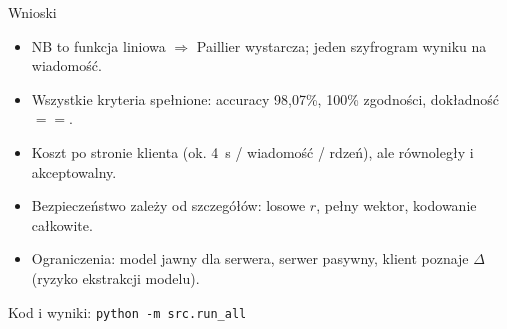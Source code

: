 \documentclass[aspectratio=169,11pt]{beamer}
\begin{document}
\begin{frame}{Wnioski}
  \begin{itemize}
    \item NB to funkcja liniowa $\Rightarrow$ Paillier wystarcza; jeden szyfrogram wyniku na wiadomość.
    \item Wszystkie kryteria spełnione: accuracy 98,07\%, 100\% zgodności, dokładność $==$.
    \item Koszt po stronie klienta (ok. 4~s / wiadomość / rdzeń), ale równoległy i akceptowalny.
    \item Bezpieczeństwo zależy od szczegółów: \alert{losowe $r$}, \alert{pełny wektor}, \alert{kodowanie całkowite}.
    \item Ograniczenia: model jawny dla serwera, serwer pasywny, klient poznaje $\Delta$ (ryzyko ekstrakcji modelu).
  \end{itemize}
  \vspace{1em}
  \centering
  Kod i wyniki: \texttt{python -m src.run\_all}
\end{frame}
\end{document}
